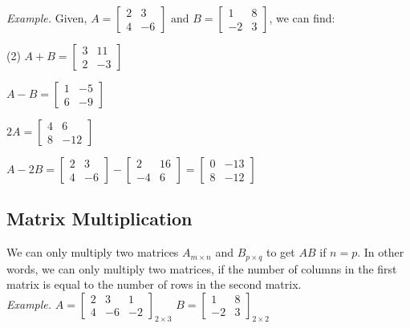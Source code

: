 \documentclass{./../Latex/handout}
\begin{document}
\textit{Example.}
Given, $A = \begin{bmatrix}
2 & 3 \\
4 & -6 
 \end{bmatrix} \text{ and }
B = \begin{bmatrix}
1 & 8 \\
-2 & 3
\end{bmatrix}$, we can find:
\begin{tasks}(2)
\task \( A+ B = \begin{bmatrix}
3 & 11 \\
2 & -3
\end{bmatrix} \)

\task \( A- B = \begin{bmatrix}
1 & -5 \\
6 & -9
\end{bmatrix} \) 

\task \( 2A = \begin{bmatrix}
4 & 6 \\
8 & -12
\end{bmatrix} \) 

\task \( A-2B =  \begin{bmatrix}
2 & 3 \\
4 & -6 
 \end{bmatrix} -  \begin{bmatrix}
2 & 16 \\
-4 & 6 
 \end{bmatrix} = \begin{bmatrix}
0 & -13 \\
8 & -12 
 \end{bmatrix} \) 
 \end{tasks}

\subsection{Matrix Multiplication}

We can only multiply two matrices $A_{m \times n}$ and $B_{p \times q}$ to get $AB$ if $ n = p $. In other words, we can only multiply two matrices, if the number of columns in the first matrix is equal to the number of rows in the second matrix. \\

\textit{Example.}
$A = \begin{bmatrix}
2 & 3 & 1 \\
4 & -6 & -2
\end{bmatrix}_{2 \times 3}$ 
$B = \begin{bmatrix}
1 & 8 \\
-2 & 3
\end{bmatrix}_{2 \times 2}$ 
\end{document}
